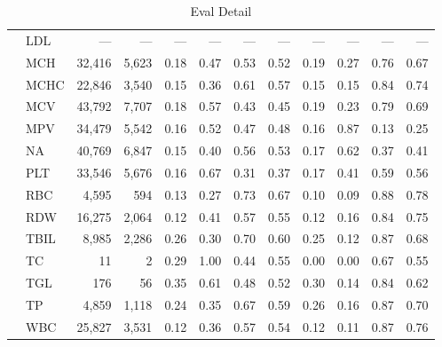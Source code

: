 \begin{table}[ht]
\begin{tabular}{llrrrrrrrrrr}
 & LDL & --- & --- & --- & --- & --- & --- & --- & --- & --- & --- \\
 & MCH & 32,416 & 5,623 & 0.18 & 0.47 & 0.53 & 0.52 & 0.19 & 0.27 & 0.76 & 0.67 \\
 & MCHC & 22,846 & 3,540 & 0.15 & 0.36 & 0.61 & 0.57 & 0.15 & 0.15 & 0.84 & 0.74 \\
 & MCV & 43,792 & 7,707 & 0.18 & 0.57 & 0.43 & 0.45 & 0.19 & 0.23 & 0.79 & 0.69 \\
 & MPV & 34,479 & 5,542 & 0.16 & 0.52 & 0.47 & 0.48 & 0.16 & 0.87 & 0.13 & 0.25 \\
 & NA & 40,769 & 6,847 & 0.15 & 0.40 & 0.56 & 0.53 & 0.17 & 0.62 & 0.37 & 0.41 \\
 & PLT & 33,546 & 5,676 & 0.16 & 0.67 & 0.31 & 0.37 & 0.17 & 0.41 & 0.59 & 0.56 \\
 & RBC & 4,595 & 594 & 0.13 & 0.27 & 0.73 & 0.67 & 0.10 & 0.09 & 0.88 & 0.78 \\
 & RDW & 16,275 & 2,064 & 0.12 & 0.41 & 0.57 & 0.55 & 0.12 & 0.16 & 0.84 & 0.75 \\
 & TBIL & 8,985 & 2,286 & 0.26 & 0.30 & 0.70 & 0.60 & 0.25 & 0.12 & 0.87 & 0.68 \\
 & TC & 11 & 2 & 0.29 & 1.00 & 0.44 & 0.55 & 0.00 & 0.00 & 0.67 & 0.55 \\
 & TGL & 176 & 56 & 0.35 & 0.61 & 0.48 & 0.52 & 0.30 & 0.14 & 0.84 & 0.62 \\
 & TP & 4,859 & 1,118 & 0.24 & 0.35 & 0.67 & 0.59 & 0.26 & 0.16 & 0.87 & 0.70 \\
 & WBC & 25,827 & 3,531 & 0.12 & 0.36 & 0.57 & 0.54 & 0.12 & 0.11 & 0.87 & 0.76 \\
\bottomrule
\end{tabular}
\caption{Eval Detail}
\label{tab:eval_detail}
\end{table}